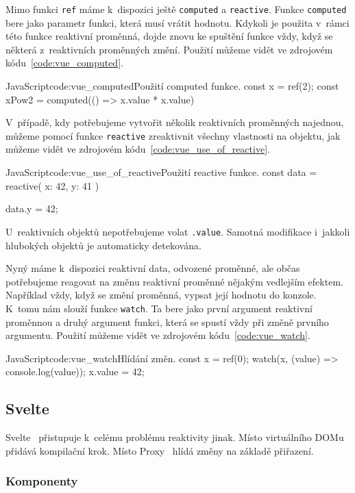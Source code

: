 \documentclass[
  master,
  program=ainf,
  printversion,
  tables=false,
  sourcecodes,
  glossaries,
  index
]{kidiplom}
\begin{document}
Mimo funkci {\tt ref} máme k~dispozici ještě {\tt computed} a {\tt reactive}. Funkce {\tt computed} bere jako parametr
funkci, která musí vrátit hodnotu. Kdykoli je použita v~rámci této funkce reaktivní proměnná, 
dojde znovu ke spuštění funkce vždy, když se některá z~reaktivních proměnných změní.
Použití můžeme vidět ve zdrojovém kódu~\ref{code:vue_computed}.

\begin{kicode}{JavaScript}{code:vue_computed}{Použití computed funkce.}
  const x = ref(2);
  const xPow2 = computed(() => x.value * x.value)
\end{kicode}

V~případě, kdy potřebujeme vytvořit několik reaktivních proměnných najednou, můžeme pomocí
funkce {\tt reactive} zreaktivnit všechny vlastnosti na objektu, jak můžeme vidět ve zdrojovém kódu~\ref{code:vue_use_of_reactive}.

\begin{kicode}{JavaScript}{code:vue_use_of_reactive}{Použití reactive funkce.}
  const data = reactive({
    x: 42,
    y: 41
  })

  data.y = 42;
\end{kicode}

U~reaktivních objektů nepotřebujeme volat {\tt .value}. Samotná modifikace i~jakkoli hlubokých
objektů je automaticky detekována. 

Nyný máme k~dispozici reaktivní data, odvozené proměnné, ale občas potřebujeme reagovat
na změnu reaktivní proměnné nějakým vedlejším efektem. Například vždy, když se změní
proměnná, vypsat její hodnotu do konzole. K~tomu nám slouží funkce {\tt watch}. Ta bere jako 
první argument reaktivní proměnnou a druhý argument funkci, která se spustí vždy při změně
prvního argumentu. Použití můžeme vidět ve zdrojovém kódu~\ref{code:vue_watch}.

\begin{kicode}{JavaScript}{code:vue_watch}{Hlídání změn.}
  const x = ref(0);
  watch(x, (value) => console.log(value));
  x.value = 42;
\end{kicode}

\subsection{Svelte}
Svelte~\cite{svelte} přistupuje k~celému problému reaktivity jinak. Místo virtuálního DOMu přidává kompilační
krok. Místo Proxy~\cite{proxy} hlídá změny na základě přiřazení.

\subsubsection{Komponenty}
\end{document}
